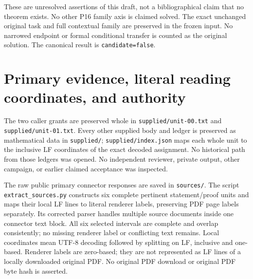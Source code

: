 \documentclass[10pt]{article}
\begin{document}
These are unresolved assertions of this draft, not a bibliographical
claim that no theorem exists. No other P16 family axis is claimed solved.
The exact unchanged original task and full contextual family are preserved
in the frozen input. No narrowed endpoint or formal conditional transfer
is counted as the original solution. The canonical result is
\texttt{candidate=false}.

\appendix
\section{Primary evidence, literal reading coordinates, and authority}
The two caller grants are preserved whole in
\texttt{supplied/unit-00.txt} and \texttt{supplied/unit-01.txt}.
Every other supplied body and ledger is preserved as mathematical data
in \texttt{supplied/}; \texttt{supplied/index.json} maps each whole unit
to the inclusive LF coordinates of the exact decoded assignment.
No historical path from those ledgers was opened. No independent reviewer,
private output, other campaign, or earlier claimed acceptance was inspected.

The raw public primary connector responses are saved in \texttt{sources/}.
The script \texttt{extract\_sources.py} constructs six complete pertinent
statement/proof units and maps their local LF lines to literal renderer
labels, preserving PDF page labels separately. Its corrected parser handles
multiple source documents inside one connector text block. All six selected
intervals are complete and overlap consistently; no missing renderer label
or conflicting text remains. Local coordinates mean UTF-8 decoding followed
by splitting on LF, inclusive and one-based. Renderer labels are zero-based;
they are not represented as LF lines of a locally downloaded original PDF.
No original PDF download or original PDF byte hash is asserted.
\end{document}
